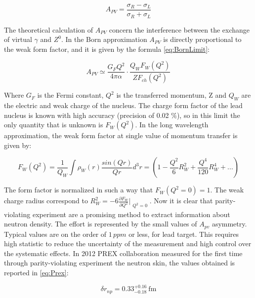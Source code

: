 \begin{equation}
A_{PV} = \dfrac{\sigma_{R} - \sigma_{L}}{\sigma_{R} + \sigma_{L}}
\end{equation} 

The theoretical calculation of $A_{PV}$ concern the interference between the exchange of virtual $\gamma$ and $Z^{0}$. In the Born approximation $A_{PV}$ is directly proportional to the weak form factor, and it is given by the formula \ref{eq:BornLimit}:

\begin{equation} \label{eq:BornLimit}
A_{PV} \simeq \dfrac{G_{F} Q^{2}}{4 \pi \alpha} \cdot \dfrac{Q_{W} F_{W}(Q^{2})}{Z F_{ch}(Q^{2})}
\end{equation} 

Where $G_{F}$ is the Fermi constant, $Q^{2}$ is the transferred momentum, Z and $Q_{W}$ are the electric and weak charge of the nucleus. The charge form factor of the lead nucleus is known with high accuracy (precision of 0.02 \%), so in this limit the only quantity that is unknown is $F_{W}(Q^{2})$. In the long wavelength approximation, the weak form factor at single value of momentum transfer is given by:

\begin{equation}
F_{W}(Q^{2}) = \frac{1}{Q_{W}} \int \rho_{W}(r) \dfrac{sin(Qr)}{Qr} d^{3}r = (1 - \frac{Q^{2}}{6} R^{2}_{W} + \frac{Q^{4}}{120}R^{4}_{W} + ...)  
\end{equation}

The form factor is normalized in such a way that $F_{W}(Q^{2} = 0) = 1$. The weak charge radius correspond to $R^{2}_{W} = -6 \frac{\partial F_{W}}{\partial Q^{2}}\Bigr|_{\substack{Q^{2} = 0}}$. Now it is clear that parity-violating experiment are a promising method to extract information about neutron density. The effort is represented by the small values of $A_{pv}$ asymmetry. Typical values are on the order of $1 \, ppm$ or less, for lead target. This requires high statistic to reduce the uncertainty of the measurement and high control over the systematic effects. In 2012 PREX collaboration measured for the first time through parity-violating experiment the neutron skin, the values obtained is reported in \ref{eq:Prex}:

\begin{equation} \label{eq:Prex}
\delta r_{np} = 0.33^{+0.16}_{-0.18} \SI{}{\femto \meter}
\end{equation}

